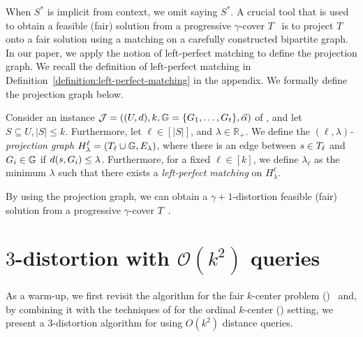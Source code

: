 \documentclass{article}
\newcommand{\bigO}{\ensuremath{\mathcal{O}}\xspace}
\begin{document}
When $S^*$ is implicit from context, we omit saying \wrt $S^*$.
A crucial tool that is used to obtain a feasible (fair) solution from a progressive $\gamma$-cover $T$~\cite{gadekar2025fair,jones2020fair} is to project $T$ onto a fair solution using a matching on a carefully constructed bipartite graph. 
In our paper, we apply the notion of left-perfect matching to define the projection graph. We recall the definition of left-perfect matching in Definition~\ref{definition:left-perfect-matching} in the appendix.
We formally define the projection graph below.
\begin{definition}
Consider an instance $\mathcal{J}=((U,d),k,\mathbb{G}=\{G_1,\dots,G_t\},\vec{\alpha})$ of \fairkcenter, and let $S \subseteq U, |S|\le k$. Furthermore, let $\ell \in [|S|]$, and $\lambda \in \mathbb{R}_+$. 
We define the \emph{$(\ell, \lambda)$-projection graph}  $H^{\ell}_{\lambda} = (T_{\ell} \cup \mathbb{G}, E_{\lambda})$, where there is an edge between  $s \in T_{\ell}$ and $G_i \in \mathbb{G}$ if $d(s, G_i) \le \lambda$. Furthermore, for a fixed $\ell \in [k]$, we define $\lambda_{\ell}$ as the minimum $\lambda$ such that there exists a \emph{left-perfect matching} on $H^{\ell}_{\lambda}$. 
\end{definition}

By using the projection graph, we can obtain a $\gamma+1$-distortion feasible (fair) solution from a progressive $\gamma$-cover $T$~\cite{gadekar2025fair,jones2020fair}.






























\section{$3$-distortion with $\bigO(k^2)$ queries}
\label{sec:conventional-algorithms}



As a warm-up, we first revisit the algorithm for the fair $k$-center problem (\fairkcenter)~\cite{gadekar2025fair} and, by combining it with the techniques of \citet{burkhardt2024low} for the ordinal $k$-center (\ordkcen) setting, we present a 3-distortion algorithm for \ordfairkcen using $O(k^2)$ distance queries.
\end{document}
